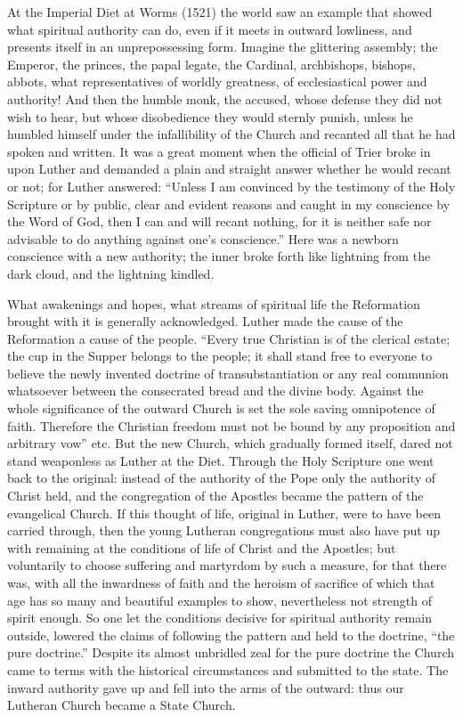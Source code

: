 \documentclass[12pt,a4paper,openany]{book}
\newcommand{\opage}[1]{\marginnote{\footnotesize\textit{[#1]}}}
\begin{document}
At the Imperial Diet at Worms (1521) the world saw an
example that showed what spiritual authority can do,
even if it meets in outward lowliness, and presents itself
\setcounter{footnote}{0}%
\opage{78}in an unprepossessing form. Imagine the
glittering assembly; the Emperor, the princes, the papal
legate, the Cardinal, archbishops, bishops,
abbots, what representatives of worldly greatness,
of ecclesiastical power and authority! And then the humble
monk, the accused, whose defense they did not wish to
hear, but whose disobedience they would sternly punish,
unless he humbled himself under the infallibility of the Church and
recanted all that he had spoken and
written. It was a great moment when the official
of Trier broke in upon Luther and demanded a plain and
straight answer whether he would recant or not; for
Luther answered: ``Unless I am convinced by the testimony of
the Holy Scripture or by public, clear and evident
reasons and caught in my conscience
by the Word of God, then I can and will recant nothing,
for it is neither safe nor advisable to do anything
against one's conscience.'' Here was a newborn conscience
with a new authority; the inner broke forth like
lightning from the dark cloud, and the lightning kindled.

What awakenings and hopes, what streams
of spiritual life the Reformation brought with it is generally
acknowledged. Luther made the cause of the Reformation a
cause of the people. ``Every true Christian is of the clerical
estate; the cup in the Supper belongs to the people; it shall
stand free to everyone to believe the newly invented doctrine of transubstantiation
or any real communion whatsoever
between the consecrated bread and the divine body.
Against the whole significance of the outward Church is set
the sole saving omnipotence of faith. Therefore the
Christian freedom must not be bound by any proposition and
arbitrary vow'' etc. But the new Church, which
\setcounter{footnote}{0}%
\opage{79}gradually formed itself, dared not stand weaponless
as Luther at the Diet. Through the Holy
Scripture one went back to the original: instead of
the authority of the Pope only the authority of Christ held, and
the congregation of the Apostles became the pattern of the evangelical Church.
If this thought of life, original in Luther,
were to have been carried through, then the
young Lutheran congregations must also have put up with
remaining at the conditions of life of Christ and the Apostles;
but voluntarily to choose suffering and martyrdom by such
a measure, for that there was, with all the inwardness of faith
and the heroism of sacrifice of which that
age has so many and beautiful examples to show,
nevertheless not strength of spirit enough. So one let the conditions
decisive for spiritual
authority remain outside,
lowered the claims of following the pattern and held to the
doctrine, ``the pure doctrine.'' Despite its almost unbridled
zeal for the pure doctrine the Church came to terms with
the historical circumstances and submitted to the
state. The inward authority gave up and fell into the
arms of the outward: thus our Lutheran
Church became a State Church.
\end{document}
